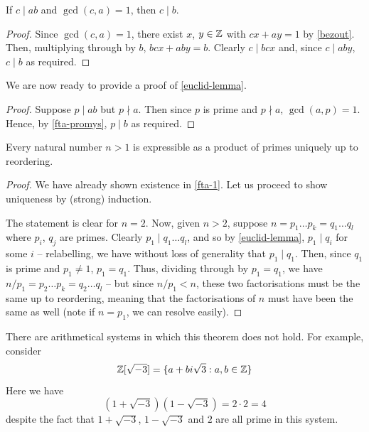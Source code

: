 \documentclass{../../template/note}
\begin{document}
    \begin{lemma}
        If \(c \mid ab\) and \(\gcd(c, a) = 1\), then \(c \mid b\).
        \label{fta-promys}
    \end{lemma}
    
    \begin{proof}
        Since \(\gcd(c, a) = 1\), there exist \(x\), \(y \in \mathbb Z\) with \(cx + ay = 1\) by \cref{bezout}. Then, multiplying through by \(b\), \(bcx + aby = b\). Clearly \(c \mid bcx\) and, since \(c \mid aby\), \(c \mid b\) as required.
    \end{proof}
    
    We are now ready to provide a proof of \cref{euclid-lemma}.

    \begin{proof}
        Suppose \(p \mid ab\) but \(p \nmid a\). Then since \(p\) is prime and \(p \nmid a\), \(\gcd(a, p) = 1\). Hence, by \cref{fta-promys}, \(p \mid b\) as required.
    \end{proof}
    
    \begin{theorem}
        Every natural number \(n > 1\) is expressible as a product of primes uniquely up to reordering.
        \label{fta}
    \end{theorem}
    
    \begin{proof}
        We have already shown existence in \cref{fta-1}. Let us proceed to show uniqueness by (strong) induction.

        The statement is clear for \(n=2\). Now, given \(n > 2\), suppose \(n = p_1\dots p_k = q_1\dots q_l\) where \(p_i\), \(q_j\) are primes. Clearly \(p_1 \mid q_1 \dots q_l\), and so by \cref{euclid-lemma}, \(p_1 \mid q_i\) for some \(i\) -- relabelling, we have without loss of generality that \(p_1 \mid q_1\). Then, since \(q_1\) is prime and \(p_1 \neq 1\), \(p_1 = q_1\). Thus, dividing through by \(p_1 = q_1\), we have \(n/p_1 = p_2\dots p_k = q_2 \dots q_l\) -- but since \(n/p_1 < n\), these two factorisations must be the same up to reordering, meaning that the factorisations of \(n\) must have been the same as well (note if \(n=p_1\), we can resolve easily).
    \end{proof}
    

    \begin{remark*}
        There are arithmetical systems in which this theorem does not hold. For example, consider
        \[
            \mathbb Z[\sqrt{-3}] = \{a + bi\sqrt{3}: a, b \in \mathbb Z\}
        \]
        Here we have
        \[
            (1 + \sqrt{-3})(1 - \sqrt{-3}) = 2 \cdot 2 = 4
        \]
        despite the fact that \(1 + \sqrt{-3}\), \(1 - \sqrt{-3}\) and \(2\) are all prime in this system.
    \end{remark*}
    
\end{document}
